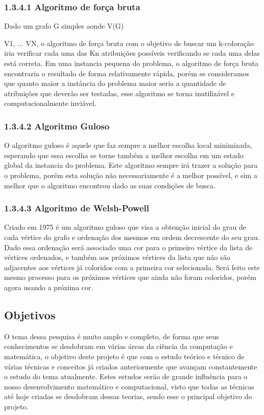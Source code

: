 \documentclass[12pt]{article}
\begin{document}
\subsubsection*{1.3.4.1 Algoritmo de força bruta}
 Dado um grafo G simples aonde V(G) {V1, ... VN, o algoritmo de força bruta com o objetivo de buscar um k-coloração iria verificar cada uma das Kn atribuições possíveis verificando se cada uma delas está correta. Em uma instancia pequena do problema, o algoritmo de força bruta encontraria o resultado de forma relativamente rápida, porém se consideramos que quanto maior a instância do problema maior seria a quantidade de atribuições que deverão ser testadas, esse algoritmo se torna inutilizável e computacionalmente inviável.
 	
 \subsubsection*{1.3.4.2 Algoritmo Guloso}
 	
 	O algoritmo guloso é aquele que faz sempre a melhor escolha local minimizada, esperando que essa escolha se torne também a melhor escolha em um estado global da instancia do problema.
 	Este algoritmo sempre irá trazer a solução para o problema, porém esta solução não necessariamente é a melhor possível, e sim a melhor que o algoritmo encontrou dado as suas condições de busca.
 	
 	 
  \subsubsection*{1.3.4.3 Algoritmo de Welsh-Powell}
  
  Criado em 1975 é um algoritmo guloso que visa a obtenção inicial do grau de cada vértice do grafo e ordenação dos mesmos em ordem decrescente do seu grau. Dado essa ordenação será associado uma cor para o primeiro vértice da lista de vértices ordenados, e também aos próximos vértices da lista que não são adjacentes aos vértices já coloridos com a primeira cor selecionada. Será feito este mesmo processo para os próximos vértices que ainda não foram coloridos, porém agora usando a próxima cor.
  
  \subsection{Objetivos}
  
  O tema dessa pesquisa é muito amplo e completo, de forma que seus conhecimentos se desdobram em várias áreas da ciência da computação e matemática, o objetivo deste projeto é que com o estudo teórico e técnico de várias técnicas e conceitos já criados anteriormente que avançam constantemente o estudo do tema atualmente.
  Estes estudos serão de grande influência para o nosso desenvolvimento matemático e computacional, visto que todas as técnicas até hoje criadas se desdobram dessas teorias, sendo esse o principal objetivo do projeto.
  
}
\end{document}
